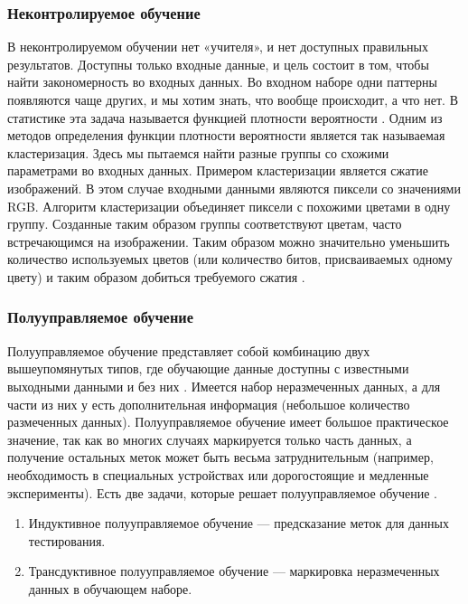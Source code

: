 \subsubsection*{Неконтролируемое обучение}

В неконтролируемом обучении нет «учителя», и нет доступных правильных результатов. Доступны только входные данные, и цель состоит в том, чтобы найти закономерность во входных данных. Во входном наборе одни паттерны появляются чаще других, и мы хотим знать, что вообще происходит, а что нет. В статистике эта задача называется функцией плотности вероятности \cite{surverymashin}.
Одним из методов определения функции плотности вероятности является так называемая кластеризация. Здесь мы пытаемся найти разные группы со схожими параметрами во входных данных. Примером кластеризации является сжатие изображений. В этом случае входными данными являются пиксели со значениями RGB. Алгоритм кластеризации объединяет пиксели с похожими цветами в одну группу. Созданные таким образом группы соответствуют цветам, часто встречающимся на изображении. Таким образом можно значительно уменьшить количество используемых цветов (или количество битов, присваиваемых одному цвету) и таким образом добиться требуемого сжатия \cite{introdmachlearn}.

\subsubsection*{Полууправляемое обучение}

Полууправляемое обучение представляет собой комбинацию двух вышеупомянутых типов, где обучающие данные доступны с известными выходными данными и без них \cite{surverymashin}. Имеется набор неразмеченных данных, а для части из них у есть дополнительная информация (небольшое количество размеченных данных). Полууправляемое обучение имеет большое практическое значение, так как во многих случаях маркируется только часть данных, а получение остальных меток может быть весьма затруднительным (например, необходимость в специальных устройствах или дорогостоящие и медленные эксперименты). Есть две задачи, которые решает полууправляемое обучение \cite{transactonne}.
\begin{enumerate}[label=\arabic*)]
	\item Индуктивное полууправляемое обучение --- предсказание меток для данных тестирования.
	\item Трансдуктивное полууправляемое обучение --- маркировка неразмеченных данных в обучающем наборе.
\end{enumerate}

